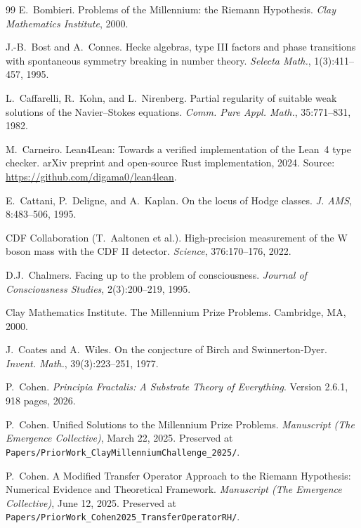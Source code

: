 \documentclass[11pt,a4paper]{amsart}
\theoremstyle{plain}
\theoremstyle{definition}
\begin{document}
\begin{thebibliography}{99}
E.~Bombieri.
\newblock Problems of the Millennium: the Riemann Hypothesis.
\newblock \emph{Clay Mathematics Institute}, 2000.

J.-B.~Bost and A.~Connes.
\newblock Hecke algebras, type III factors and phase transitions with spontaneous symmetry breaking in number theory.
\newblock \emph{Selecta Math.}, 1(3):411--457, 1995.

L.~Caffarelli, R.~Kohn, and L.~Nirenberg.
\newblock Partial regularity of suitable weak solutions of the Navier--Stokes equations.
\newblock \emph{Comm. Pure Appl. Math.}, 35:771--831, 1982.

M.~Carneiro.
\newblock Lean4Lean: Towards a verified implementation of the Lean~4 type checker.
\newblock arXiv preprint and open-source Rust implementation, 2024. Source: \url{https://github.com/digama0/lean4lean}.

E.~Cattani, P.~Deligne, and A.~Kaplan.
\newblock On the locus of Hodge classes.
\newblock \emph{J. AMS}, 8:483--506, 1995.

CDF Collaboration (T.~Aaltonen et al.).
\newblock High-precision measurement of the W boson mass with the CDF II detector.
\newblock \emph{Science}, 376:170--176, 2022.

D.J.~Chalmers.
\newblock Facing up to the problem of consciousness.
\newblock \emph{Journal of Consciousness Studies}, 2(3):200--219, 1995.

Clay Mathematics Institute.
\newblock The Millennium Prize Problems.
\newblock Cambridge, MA, 2000.

J.~Coates and A.~Wiles.
\newblock On the conjecture of Birch and Swinnerton-Dyer.
\newblock \emph{Invent. Math.}, 39(3):223--251, 1977.

P.~Cohen.
\newblock \emph{Principia Fractalis: A Substrate Theory of Everything}.
\newblock Version 2.6.1, 918 pages, 2026.

P.~Cohen.
\newblock Unified Solutions to the Millennium Prize Problems.
\newblock \emph{Manuscript (The Emergence Collective)}, March 22, 2025. Preserved at \texttt{Papers/PriorWork\_ClayMillenniumChallenge\_2025/}.

P.~Cohen.
\newblock A Modified Transfer Operator Approach to the Riemann Hypothesis: Numerical Evidence and Theoretical Framework.
\newblock \emph{Manuscript (The Emergence Collective)}, June 12, 2025. Preserved at \texttt{Papers/PriorWork\_Cohen2025\_TransferOperatorRH/}.


\end{thebibliography}
\end{document}
